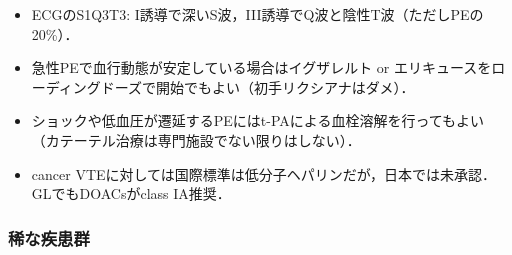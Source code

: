 \begin{itemize}
\item ECGのS1Q3T3: I誘導で深いS波，III誘導でQ波と陰性T波（ただしPEの20\%）．
\item 急性PEで血行動態が安定している場合はイグザレルト or エリキュースをローディングドーズで開始でもよい（初手リクシアナはダメ）．
\item ショックや低血圧が遷延するPEにはt-PAによる血栓溶解を行ってもよい（カテーテル治療は専門施設でない限りはしない）．
\item cancer VTEに対しては国際標準は低分子ヘパリンだが，日本では未承認．GLでもDOACsがclass IA推奨．
\end{itemize}


\subsubsection{稀な疾患群}

